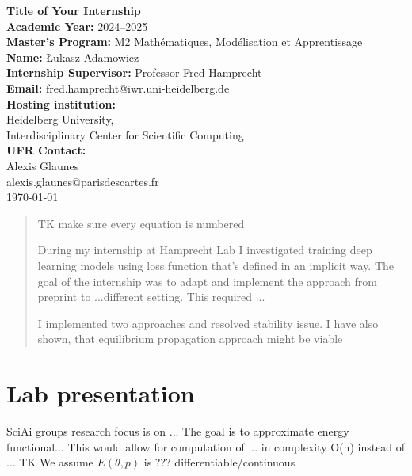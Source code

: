 \documentclass[a4paper,10pt]{report}
\author{Łukasz Adamowicz}
\begin{document}
\begin{titlepage}
    \begin{center}
        \textbf{\Large Title of Your Internship}\\[2cm]
        \textbf{Academic Year:} 2024--2025\\
        \textbf{Master's Program:} M2 Mathématiques, Modélisation et Apprentissage\\
        \textbf{Name:} Łukasz Adamowicz\\[1cm]
        \textbf{Internship Supervisor:} Professor Fred Hamprecht\\
        \textbf{Email:} fred.hamprecht@iwr.uni-heidelberg.de\\[1cm]
        \textbf{Hosting institution:}\\
        Heidelberg University,\\
        Interdisciplinary Center for Scientific Computing\\
        \textbf{UFR Contact:}\\
        Alexis Glaunes\\
        alexis.glaunes@parisdescartes.fr\\[2cm]

        \vfill
        \today
    \end{center}
\end{titlepage}


\begin{abstract}
TK make sure every equation is numbered

During my internship at Hamprecht Lab I investigated training deep learning models using loss function that's defined in an implicit way.
The goal of the internship was to adapt and implement the approach from  preprint \cite{neuralscf} to ...different setting. This required ...

I implemented two approaches and resolved stability issue. I have also shown, that equilibrium propagation approach might be viable
\end{abstract}


\tableofcontents
\newpage
\section{Lab presentation}
SciAi groups research focus is on ...
The goal is to approximate energy functional...
This would allow for computation of ... in complexity O(n) instead of ...
TK
We assume $E(\theta, p)$ is ??? differentiable/continuous
\end{document}
